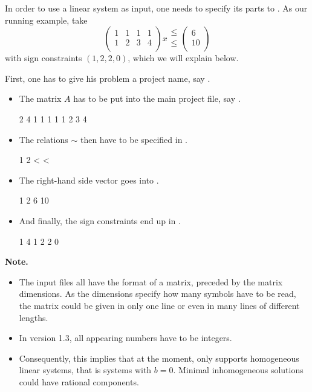 In order to use a linear system as input, one needs to specify its
parts to \FourTiTwo. As our running example, take
\[
\left(
\begin{array}{cccc}
1 & 1 & 1 & 1\\
1 & 2 & 3 & 4\\
\end{array}
\right)x
\begin{array}{c}
\leq\\
\leq\\
\end{array}
\left(
\begin{array}{c}
6\\
10\\
\end{array}
\right)
\]
with sign constraints $(1,2,2,0)$, which we will explain below.

First, one has to give his problem a project name, say
.
\begin{itemize}
\item The matrix $A$ has to be put into the main project file, say
.
\begin{myverbatim}
2 4
1 1 1 1
1 2 3 4
\end{myverbatim}
\item The relations $\sim$ then have to be specified in .
\begin{myverbatim}
1 2
< <
\end{myverbatim}
\item The right-hand side vector goes into .
\begin{myverbatim}
1 2
6 10
\end{myverbatim}
\item And finally, the sign constraints end up in .
\begin{myverbatim}
1 4
1 2 2 0
\end{myverbatim}
\end{itemize}

{\bf Note.}
\begin{itemize}
\item The input files all have the format of a matrix, preceded by
  the matrix dimensions. As the dimensions specify how many symbols
  have to be read, the matrix could be given in only one line or even
  in many lines of different lengths.
\item In \FourTiTwo{} version 1.3, all appearing numbers have to be
  integers.
\item Consequently, this implies that at the moment, 
  only supports homogeneous linear systems, that is systems with $b=0$.
  Minimal inhomogeneous solutions could have rational components.
\end{itemize}

